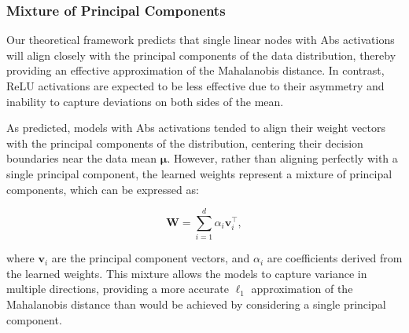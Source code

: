 \subsubsection{Mixture of Principal Components}

Our theoretical framework predicts that single linear nodes with Abs activations will align closely with the principal components of the data distribution, thereby providing an effective approximation of the Mahalanobis distance. In contrast, ReLU activations are expected to be less effective due to their asymmetry and inability to capture deviations on both sides of the mean.



As predicted, models with Abs activations tended to align their weight vectors with the principal components of the distribution, centering their decision boundaries near the data mean $\boldsymbol{\mu}$. However, rather than aligning perfectly with a single principal component, the learned weights represent a mixture of principal components, which can be expressed as:

\begin{equation}
\label{eq:mixture_pcs}
\mathbf{W} = \sum_{i=1}^d \alpha_i \mathbf{v}_i^\top,
\end{equation}

where $\mathbf{v}_i$ are the principal component vectors, and $\alpha_i$ are coefficients derived from the learned weights. This mixture allows the models to capture variance in multiple directions, providing a more accurate $\ell_1$ approximation of the Mahalanobis distance than would be achieved by considering a single principal component.

